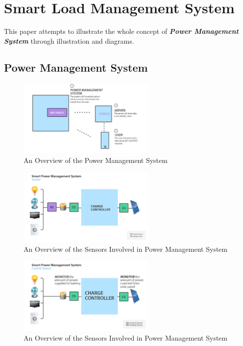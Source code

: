 \documentclass{article}
\begin{document}

\clearpage
\section{Smart Load Management System}
This paper attempts to illustrate the whole concept of \textit{\textbf{Power Management System}} through illustration and diagrams.

\subsection{Power Management System}
\begin{figure}[h]
\centering
\includegraphics[width = 0.6\textwidth]{images/PowerManagement.jpg}
\caption{An Overview of the Power Management System}
\end{figure}

\begin{figure}[h]
\centering
\includegraphics[width = 0.6\textwidth]{images/PowerManagementSensor.jpg}
\caption{An Overview of the Sensors Involved in Power Management System}
\end{figure}


\begin{figure}[h]
\centering
\includegraphics[width = 0.6\textwidth]{images/PowerManagementCurrentSensor.jpg}
\caption{An Overview of the Sensors Involved in Power Management System}
\end{figure}
\end{document}
